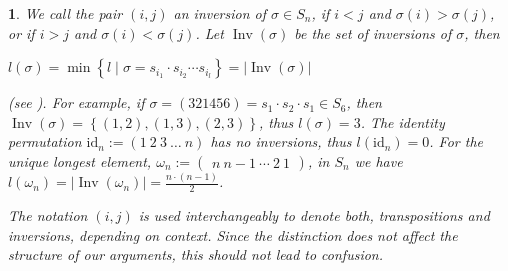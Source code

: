 \documentclass[a4 paper,12pt]{article}
\DeclareMathOperator{\Inv}{Inv}
\newtheorem{numeris}{}[section]
\begin{document}
\begin{numeris}
 We call  the pair $(i,j)$  an \textit{inversion} of $\sigma\in S_{n}$, if    $i<j$ and    $\sigma(i)>\sigma(j)$, or if    $i>j$ and    $\sigma(i)<\sigma(j)$. 
Let $\Inv(\sigma)$ be the set of inversions of $\sigma$, then 
\begin{center}
$l(\sigma) = \min\left\{l \mid  \sigma = s_{i_1}\cdot  s_{i_2} \cdots  s_{i_l}\right\} = \left|\Inv(\sigma)\right|$
\end{center}
 (see  \cite[Proposition 1.5.2]{Bjor}). For example, if  $\sigma =   \left(321456
\right)= s_1 \cdot  s_2\cdot  s_1\in S_6$, then  $\Inv(\sigma) =  \left\{(1,2),(1,3),(2,3)\right\}$, thus    $l(\sigma)=3$. 
The identity permutation $\textrm{id}_{n}:=(1\ 2 \ 3 \ \ldots \  n)$ has no inversions, thus $l(\textrm{id}_{n})=0$. For the  unique  longest element, $\omega_{n}:=\left(
\begin{array}{c}
        n\ n-1\  \cdots \ 2 \ 1
\end{array}
\right)$, in $S_{n}$ we have   $l(\omega_{n})=\left|\Inv(\omega_{n})\right|= \frac{n\cdot (n-1)}{2}$. 

The notation $(i,j)$ is used interchangeably to denote both, transpositions and inversions, depending on context. Since the distinction does not affect the structure of our arguments, this should not lead to confusion.
\label{inversions}
\end{numeris}
\end{document}
